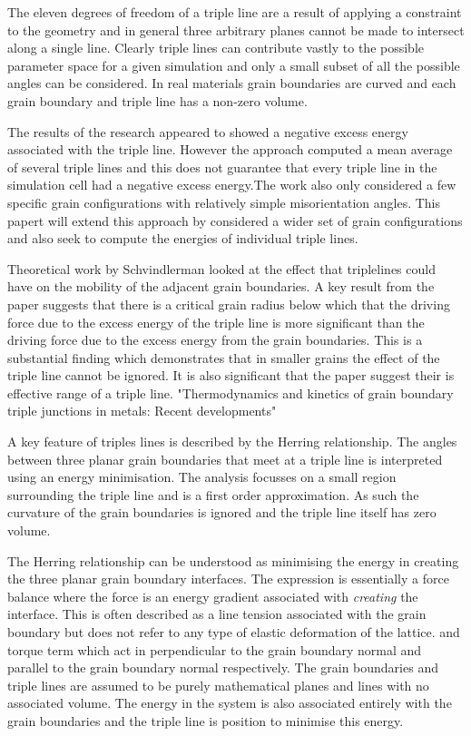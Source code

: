 \documentclass[12pt,a4paper]{book}
\begin{document}
The eleven degrees of freedom of a triple line are a result of applying a constraint to the geometry and in general three arbitrary planes cannot be made to intersect along a single line. Clearly triple lines can contribute vastly to the possible parameter space for a given simulation and only a small subset of all the possible angles can be considered. In real materials grain boundaries are curved and each grain boundary and triple line has a non-zero volume. 

 The results of the research appeared to showed a negative excess energy associated with the triple line. However the approach computed a mean average of several triple lines and this does not guarantee that every triple line in the simulation cell had a negative excess energy.The work also only considered a few specific grain configurations with relatively simple misorientation angles. This papert will extend this approach by considered a wider set of grain configurations and also seek to compute the energies of individual triple lines.

Theoretical work by Schvindlerman looked at the effect that triplelines could have on the mobility of the adjacent grain boundaries. A key result from the paper suggests that there is a critical grain radius below which that the driving force due to the excess energy of the triple line is more significant than the driving force due to the excess energy from the grain boundaries. This is a substantial finding which demonstrates that in smaller grains the effect of the triple line cannot be ignored. It is also significant that the paper suggest their is effective range of a triple line.  "Thermodynamics and kinetics of grain boundary triple junctions in metals: Recent developments"

A key feature of triples lines is described by the Herring relationship. The angles between three planar grain boundaries that meet at a triple line is interpreted using an energy minimisation. The analysis focusses on a small region surrounding
the triple line and is a first order approximation. As such the curvature of the grain boundaries is ignored and the triple line itself has zero volume.

The Herring relationship can be understood as minimising the energy in creating the three planar grain boundary interfaces. The expression is essentially a force balance where the force is an energy gradient associated with \emph{creating} the interface. This is often described as a line tension associated with the grain boundary but does not refer to any type of elastic deformation of the lattice. and torque term which act in perpendicular to the grain boundary normal and parallel to the grain boundary normal respectively. The grain boundaries and triple lines are assumed to be purely mathematical planes and lines with no associated volume. The energy in the system is also associated entirely with the grain boundaries and the triple line is position to minimise this energy. 
\end{document}
